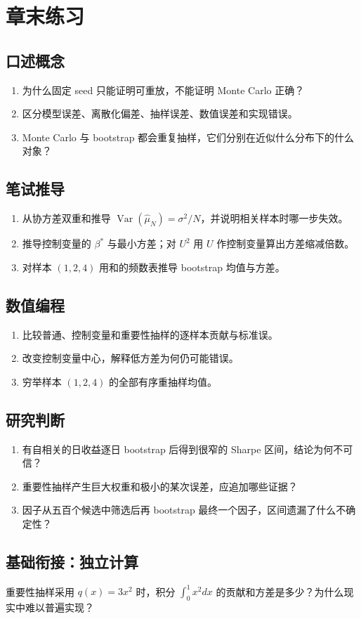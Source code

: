 \section*{章末练习}
\begingroup\small
\subsection*{口述概念}
\begin{enumerate}[nosep,leftmargin=*]
  \item 为什么固定 seed 只能证明可重放，不能证明 Monte Carlo 正确？
  \item 区分模型误差、离散化偏差、抽样误差、数值误差和实现错误。
  \item Monte Carlo 与 bootstrap 都会重复抽样，它们分别在近似什么分布下的什么对象？
\end{enumerate}

\subsection*{笔试推导}
\begin{enumerate}[nosep,leftmargin=*]
  \item 从协方差双重和推导 $\operatorname{Var}(\hat\mu_N)=\sigma^2/N$，并说明相关样本时哪一步失效。
  \item 推导控制变量的 $\beta^*$ 与最小方差；对 $U^2$ 用 $U$ 作控制变量算出方差缩减倍数。
  \item 对样本 $(1,2,4)$ 用和的频数表推导 bootstrap 均值与方差。
\end{enumerate}

\subsection*{数值编程}
\begin{enumerate}[leftmargin=*]
  \item 比较普通、控制变量和重要性抽样的逐样本贡献与标准误。
  \item 改变控制变量中心，解释低方差为何仍可能错误。
  \item 穷举样本 $(1,2,4)$ 的全部有序重抽样均值。
\end{enumerate}

\subsection*{研究判断}
\begin{enumerate}[nosep,leftmargin=*]
  \item 有自相关的日收益逐日 bootstrap 后得到很窄的 Sharpe 区间，结论为何不可信？
  \item 重要性抽样产生巨大权重和极小的某次误差，应追加哪些证据？
  \item 因子从五百个候选中筛选后再 bootstrap 最终一个因子，区间遗漏了什么不确定性？
\end{enumerate}
\endgroup

\subsection*{基础衔接：独立计算}
重要性抽样采用 $q(x)=3x^2$ 时，积分 $\int_0^1x^2dx$ 的贡献和方差是多少？为什么现实中难以普遍实现？
